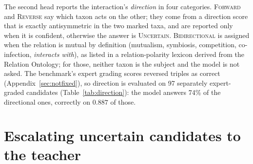\documentclass[11pt]{article}
\begin{document}
The second head reports the interaction's \emph{direction} in four categories. \textsc{Forward} and
\textsc{Reverse} say which taxon acts on the other; they come from a direction score that is exactly
antisymmetric in the two marked taxa, and are reported only when it is confident, otherwise the
answer is \textsc{Uncertain}. \textsc{Bidirectional} is assigned when the relation is mutual by
definition (mutualism, symbiosis, competition, co-infection, \emph{interacts with}), as listed in a
relation-polarity lexicon derived from the Relation Ontology; for those, neither taxon is the subject
and the model is not asked. The benchmark's expert grading scores reversed triples as correct
(Appendix~\ref{sec:notfixed}), so direction is evaluated on 97 separately expert-graded candidates
(Table~\ref{tab:direction}): the model answers 74\% of the directional ones, correctly on $0.887$ of
those.

\section{Escalating uncertain candidates to the teacher}
\label{app:cascade}

\begin{table}[t]\centering\footnotesize
\setlength{\tabcolsep}{2.6pt}
\caption{The recommended model with its candidate rules keeps its own decision except on the band of
candidates whose score lies nearest its threshold, which take a zero-shot LLM's answer to
the pair question (Qwen3-32B, the teacher, or Qwen3.5-122B-A10B); 437 rows. A rule rejection is final.
Band $0\%$ is the recommended model alone, $100\%$ the LLM alone (with the rules).}
\label{tab:cascade}
\end{table}
\end{document}
